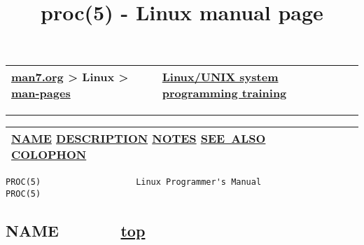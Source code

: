 \documentclass[]{article}
\title{proc(5) - Linux manual page}
\date{}
\begin{document}
\maketitle

\protect\hypertarget{top_of_page}{}{}

\begin{longtable}[]{@{}ll@{}}
\toprule
\begin{minipage}[t]{0.47\columnwidth}\raggedright\strut
\href{../../../index.html}{man7.org} \textgreater{} Linux \textgreater{}
\href{../index.html}{man-pages}\strut
\end{minipage} & \begin{minipage}[t]{0.47\columnwidth}\raggedright\strut
\href{http://man7.org/training/}{Linux/UNIX system programming
training}\strut
\end{minipage}\tabularnewline
\bottomrule
\end{longtable}

\begin{center}\rule{0.5\linewidth}{\linethickness}\end{center}

\begin{longtable}[]{@{}lll@{}}
\toprule
\begin{minipage}[t]{0.32\columnwidth}\raggedright\strut
\protect\hyperlink{NAME}{NAME} \textbar{}
\protect\hyperlink{DESCRIPTION}{DESCRIPTION} \textbar{}
\protect\hyperlink{NOTES}{NOTES} \textbar{}
\protect\hyperlink{SEE_ALSO}{SEE~ALSO} \textbar{}
\protect\hyperlink{COLOPHON}{COLOPHON}\strut
\end{minipage} & \begin{minipage}[t]{0.32\columnwidth}\raggedright\strut
\strut
\end{minipage} & \begin{minipage}[t]{0.32\columnwidth}\raggedright\strut
\strut
\end{minipage}\tabularnewline
\bottomrule
\end{longtable}

\begin{verbatim}
PROC(5)                   Linux Programmer's Manual                  PROC(5)
\end{verbatim}

\subsection{\texorpdfstring{\protect\hyperlink{NAME}{}NAME ~ ~ ~ ~
\protect\hyperlink{top_of_page}{{top}}}{NAME ~ ~ ~ ~ top}}\label{name-top}
\end{document}
